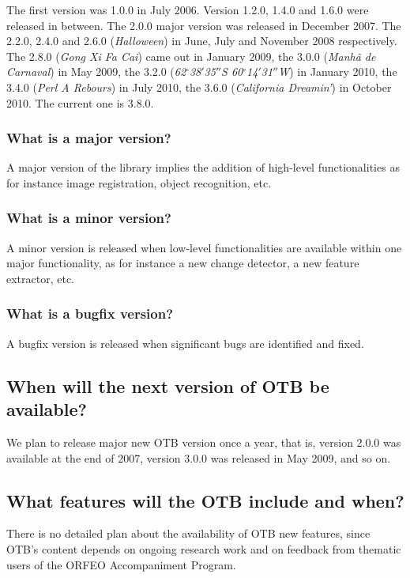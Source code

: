 The first version was 1.0.0 in July 2006. Version 1.2.0, 1.4.0 and 1.6.0 were
released in between. The 2.0.0 major version  was released in December 2007.
The 2.2.0, 2.4.0 and 2.6.0 ({\em Halloween}) in June, July and November 2008 respectively. The
2.8.0 ({\em Gong Xi Fa Cai}) came out in January 2009, the 3.0.0 ({\em Manh\~{a} de Carnaval}) in May 2009, the 3.2.0 ({\em 62$^\circ$38${'}$35${''}$S 60$^\circ$14${'}$31${''}$W}) in January 2010, the 3.4.0 ({\em Perl A Rebours}) in July 2010, the 3.6.0 ({\em California Dreamin'}) in October 2010. The current one is 3.8.0.

\subsubsection{What is a major version?}
A major version of the library implies the addition of high-level
functionalities as for instance image registration, object recognition, etc.

\subsubsection{What is a minor version?}
A minor version is released when low-level functionalities are
available within one major functionality, as for instance a new
change detector, a new feature extractor, etc.

\subsubsection{What is a bugfix version?}
A bugfix version is released when significant bugs are identified and fixed.

\subsection{When will the next version of OTB be available?}
We plan to release major new OTB version once a year, that is, version
2.0.0 was available at the end of 2007, version 3.0.0 was released
in May 2009, and so on.

\subsection{What features will the OTB include and when?}
There is no detailed plan about the availability of OTB new features,
since OTB's content depends on ongoing research work and on feedback
from thematic users of the ORFEO Accompaniment Program.

